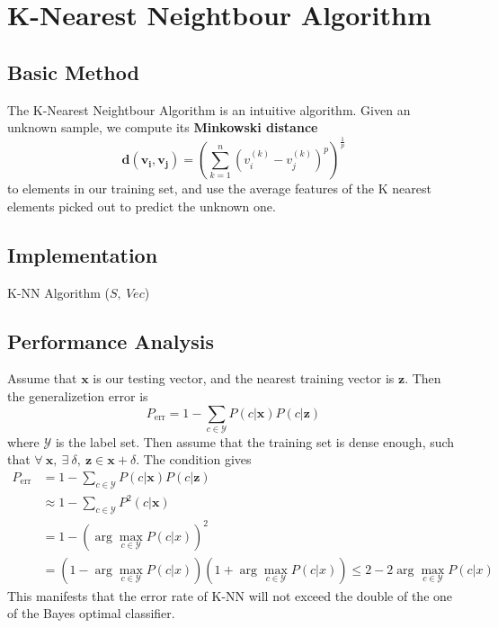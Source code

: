\documentclass[12pt]{article}
\begin{document}
\section{K-Nearest Neightbour Algorithm}
\subsection{Basic Method}
The K-Nearest Neightbour Algorithm is an intuitive algorithm. Given an unknown sample, we compute its \textbf{Minkowski distance}
\begin{equation}
    \bm{d}(\bm{v_i}, \bm{v_j}) = \left( \sum_{k=1}^n (v_i^{(k)} - v_j^{(k)})^p\right)^{\frac{1}{p}}
\end{equation}
to elements in our training set, and use the average features of the K nearest elements picked out to predict the unknown one.
\subsection{Implementation}
\begin{algorithm}
    \caption{K-NN Algorithm ($S,~Vec$)}
    \label{K-NN}
    \begin{algorithmic}
        \ENDFOR
    \end{algorithmic}
\end{algorithm}
\subsection{Performance Analysis}
Assume that $\bm{x}$ is our testing vector, and the nearest training vector is $\bm{z}$. Then the generalizetion error is
\begin{equation}
    P_{\text{err}} = 1 - \sum_{c \in \mathcal{Y}}P(c|\bm{x})P(c|\bm{z})
\end{equation}
where $\mathcal{Y}$ is the label set. Then assume that the training set is dense enough, such that $\forall~\bm{x},~\exists~\delta,~\bm{z} \in \bm{x} + \delta$. The condition gives
\begin{equation}
    \begin{aligned}
    P_{\text{err}} &= 1 - \sum_{c \in \mathcal{Y}}P(c|\bm{x})P(c|\bm{z})\\ &\approx 1 - \sum_{c \in \mathcal{Y}}P^2(c|\bm{x}) \\
    &= 1 - \left(  \arg \max_{c \in \mathcal{Y}} P(c|x) \right)^2 \\
    &= \left( 1 -  \arg \max_{c \in \mathcal{Y}} P(c|x) \right) \left( 1 + \arg \max_{c \in \mathcal{Y}} P(c|x) \right) \leq 2 -  2 \arg \max_{c \in \mathcal{Y}} P(c|x)
    \end{aligned}
\end{equation}
This manifests that the error rate of K-NN will not exceed the double of the one of the Bayes optimal classifier.
\end{document}
